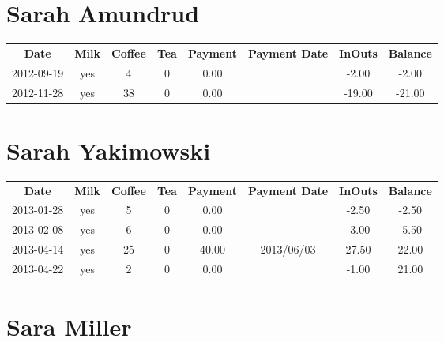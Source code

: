 \section{Sarah Amundrud}

\begin{center}
\begin{tabular}{cccccccc}
\textbf{Date} & \textbf{Milk} & \textbf{Coffee} & \textbf{Tea} & \textbf{Payment} & \textbf{Payment Date} & \textbf{InOuts} & \textbf{Balance} \\
2012-09-19 & yes &  4 & 0 & 0.00 &  &  -2.00 &  -2.00\\ 
2012-11-28 & yes & 38 & 0 & 0.00 &  & -19.00 & -21.00
\end{tabular}
\end{center}

\section{Sarah Yakimowski}

\begin{center}
\begin{tabular}{cccccccc}
\textbf{Date} & \textbf{Milk} & \textbf{Coffee} & \textbf{Tea} & \textbf{Payment} & \textbf{Payment Date} & \textbf{InOuts} & \textbf{Balance} \\
2013-01-28 & yes &  5 & 0 &  0.00 &  & -2.50 & -2.50\\ 
2013-02-08 & yes &  6 & 0 &  0.00 &  & -3.00 & -5.50\\ 
2013-04-14 & yes & 25 & 0 & 40.00 & 2013/06/03 & 27.50 & 22.00\\ 
2013-04-22 & yes &  2 & 0 &  0.00 &  & -1.00 & 21.00
\end{tabular}
\end{center}

\section{Sara Miller}

